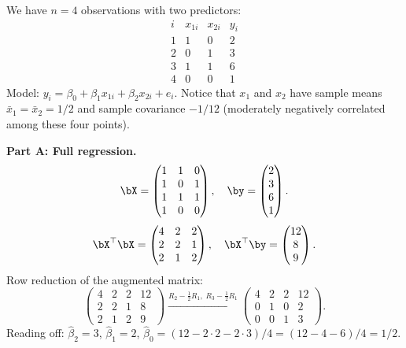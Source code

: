 \begin{example}\label{ex:fwl}
We have $n=4$ observations with two predictors:
\[
\begin{array}{c|ccc}
i & x_{1i} & x_{2i} & y_i \\\hline
1 & 1 & 0 & 2 \\
2 & 0 & 1 & 3 \\
3 & 1 & 1 & 6 \\
4 & 0 & 0 & 1
\end{array}
\]
Model: $y_i = \beta_0 + \beta_1 x_{1i} + \beta_2 x_{2i} + e_i$.
Notice that $x_1$ and $x_2$ have sample means $\bar{x}_1 = \bar{x}_2 = 1/2$
and sample covariance $-1/12$ (moderately negatively correlated among these four points).

\medskip\noindent\textbf{Part A: Full regression.}
\[
\bX = \begin{pmatrix}1&1&0\\1&0&1\\1&1&1\\1&0&0\end{pmatrix},\quad
\by=\begin{pmatrix}2\\3\\6\\1\end{pmatrix}.
\]
\[
\bX^\top\bX = \begin{pmatrix}4&2&2\\2&2&1\\2&1&2\end{pmatrix},\quad
\bX^\top\by = \begin{pmatrix}12\\8\\9\end{pmatrix}.
\]
Row reduction of the augmented matrix:
\[
\left(\begin{array}{ccc|c}
4&2&2&12\\2&2&1&8\\2&1&2&9
\end{array}\right)
\xrightarrow{R_2-\frac{1}{2}R_1,\;R_3-\frac{1}{2}R_1}
\left(\begin{array}{ccc|c}
4&2&2&12\\0&1&0&2\\0&0&1&3
\end{array}\right).
\]
Reading off: $\hat\beta_2 = 3$, $\hat\beta_1 = 2$,
$\hat\beta_0 = (12-2\cdot 2-2\cdot 3)/4 = (12-4-6)/4 = 1/2$.


\end{example}
